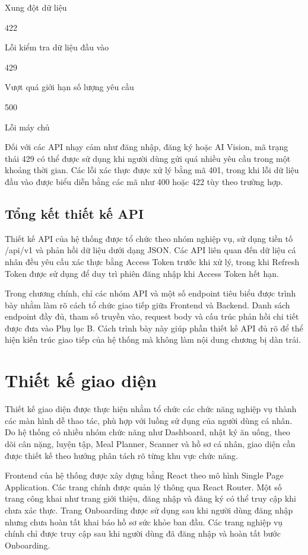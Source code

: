 \documentclass[12pt, a4paper]{report}
\begin{document}
Xung đột dữ liệu

422

Lỗi kiểm tra dữ liệu đầu vào

429

Vượt quá giới hạn số lượng yêu cầu

500

Lỗi máy chủ

Đối với các API nhạy cảm như đăng nhập, đăng ký hoặc AI Vision, mã trạng thái 429 có thể được sử dụng khi người dùng gửi quá nhiều yêu cầu trong một khoảng thời gian. Các lỗi xác thực được xử lý bằng mã 401, trong khi lỗi dữ liệu đầu vào được biểu diễn bằng các mã như 400 hoặc 422 tùy theo trường hợp.

\subsection{Tổng kết thiết kế API}Thiết kế API của hệ thống được tổ chức theo nhóm nghiệp vụ, sử dụng tiền tố /api/v1 và phản hồi dữ liệu dưới dạng JSON. Các API liên quan đến dữ liệu cá nhân đều yêu cầu xác thực bằng Access Token trước khi xử lý, trong khi Refresh Token được sử dụng để duy trì phiên đăng nhập khi Access Token hết hạn.

Trong chương chính, chỉ các nhóm API và một số endpoint tiêu biểu được trình bày nhằm làm rõ cách tổ chức giao tiếp giữa Frontend và Backend. Danh sách endpoint đầy đủ, tham số truyền vào, request body và cấu trúc phản hồi chi tiết được đưa vào Phụ lục B. Cách trình bày này giúp phần thiết kế API đủ rõ để thể hiện kiến trúc giao tiếp của hệ thống mà không làm nội dung chương bị dàn trải.

\section{Thiết kế giao diện}Thiết kế giao diện được thực hiện nhằm tổ chức các chức năng nghiệp vụ thành các màn hình dễ thao tác, phù hợp với luồng sử dụng của người dùng cá nhân. Do hệ thống có nhiều nhóm chức năng như Dashboard, nhật ký ăn uống, theo dõi cân nặng, luyện tập, Meal Planner, Scanner và hồ sơ cá nhân, giao diện cần được thiết kế theo hướng phân tách rõ từng khu vực chức năng.

Frontend của hệ thống được xây dựng bằng React theo mô hình Single Page Application. Các trang chính được quản lý thông qua React Router. Một số trang công khai như trang giới thiệu, đăng nhập và đăng ký có thể truy cập khi chưa xác thực. Trang Onboarding được sử dụng sau khi người dùng đăng nhập nhưng chưa hoàn tất khai báo hồ sơ sức khỏe ban đầu. Các trang nghiệp vụ chính chỉ được truy cập sau khi người dùng đã đăng nhập và hoàn tất bước Onboarding.
\end{document}
